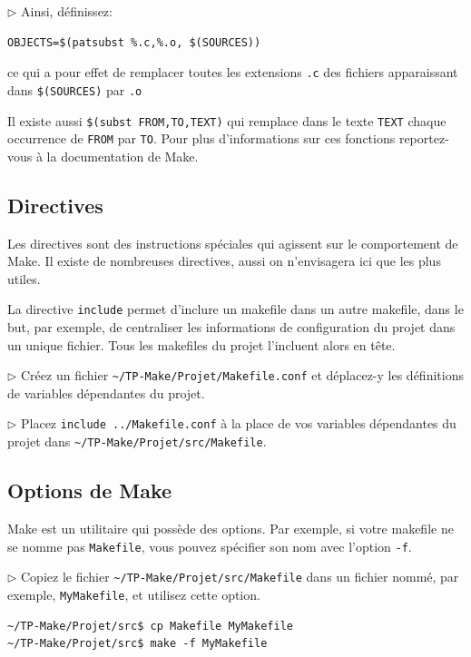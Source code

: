 \documentclass[11pt,a4paper]{article}
\newcommand{\must}{\noindent $\triangleright$ \xspace}
\begin{document}
\medskip

\must Ainsi, définissez:
{\small
\begin{verbatim}
OBJECTS=$(patsubst %.c,%.o, $(SOURCES))
\end{verbatim}
}
\noindent ce qui a pour effet de remplacer toutes les extensions
\texttt{.c} des fichiers apparaissant dans \texttt{\small \$(SOURCES)}
par \texttt{.o}

\medskip

\noindent Il existe aussi {\small \verb!$(subst FROM,TO,TEXT)!} qui
remplace dans le texte \texttt{\small TEXT} chaque occurrence de
\texttt{\small FROM} par \texttt{\small TO}. Pour plus d'informations
sur ces fonctions repor\-tez-vous à la documentation de \textsf{Make}.

\subsection{Directives}

Les directives sont des instructions spéciales qui agissent sur le
comportement de \textsf{Make}. Il existe de nombreuses directives,
aussi on n'envisagera ici que les plus utiles.

La directive \texttt{include} permet d'inclure un makefile
dans un autre makefile, dans le but, par exemple, de
centraliser les informations de configuration du projet dans un unique
fichier. Tous les makefiles du projet l'incluent alors en
tête.

\medskip

\must Créez un fichier \verb!~/TP-Make/Projet/Makefile.conf!  et
déplacez-y les définitions de variables dépendantes du projet.

\medskip

\must Placez \texttt{include ../Makefile.conf} à la place de vos
variables dépendantes du projet dans
{\small \verb!~/TP-Make/Projet/src/Makefile!}.

\subsection{Options de \textsf{Make}}

\textsf{Make} est un utilitaire qui possède des options. Par exemple,
si votre makefile ne se nomme pas \texttt{Makefile}, vous
pouvez spécifier son nom avec l'option \texttt{-f}.

\medskip

\must Copiez le fichier {\small \verb!~/TP-Make/Projet/src/Makefile!}
dans un fichier nommé, par exemple, \texttt{MyMakefile}, et utilisez
cette option.
{\small
\begin{verbatim}
~/TP-Make/Projet/src$ cp Makefile MyMakefile
~/TP-Make/Projet/src$ make -f MyMakefile
\end{verbatim}
}
\end{document}
